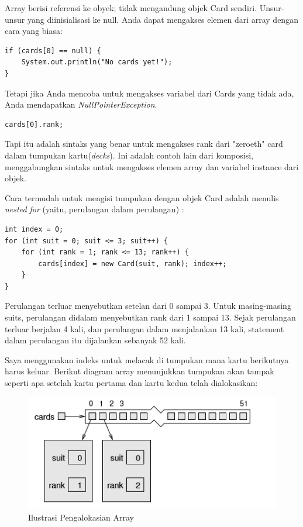 \documentclass[12pt,b5paper,openright,twoside]{book}
\begin{document}
\noindent Array berisi referensi ke obyek; tidak mengandung objek Card sendiri. Unsur-unsur yang diinisialisasi ke null. Anda dapat mengakses elemen dari array dengan cara yang biasa:
\begin{lstlisting}
if (cards[0] == null) { 
    System.out.println("No cards yet!"); 
}
\end{lstlisting}
\noindent Tetapi jika Anda mencoba untuk mengakses variabel dari Cards yang tidak ada, Anda mendapatkan \textit{NullPointerException}.
\begin{lstlisting}
cards[0].rank;
\end{lstlisting}

\noindent Tapi itu adalah sintaks yang benar untuk mengakses rank dari "zeroeth" card dalam tumpukan kartu(\textit{decks}). Ini adalah contoh lain dari komposisi, menggabungkan sintaks untuk mengakses elemen array dan variabel instance dari objek.

\noindent Cara termudah untuk mengisi tumpukan dengan objek Card adalah menulis \textit{nested for} (yaitu, perulangan dalam perulangan) : 
\begin{lstlisting}
int index = 0; 
for (int suit = 0; suit <= 3; suit++) { 
    for (int rank = 1; rank <= 13; rank++) { 
        cards[index] = new Card(suit, rank); index++; 
    } 
}
\end{lstlisting}

\noindent Perulangan terluar menyebutkan setelan dari 0 sampai 3. Untuk masing-masing suits, perulangan didalam menyebutkan rank dari 1 sampai 13. Sejak perulangan terluar berjalan 4 kali, dan perulangan dalam menjalankan 13 kali, statement dalam perulangan itu dijalankan sebanyak 52 kali.

\noindent Saya menggunakan indeks untuk melacak di tumpukan mana kartu berikutnya harus keluar. Berikut diagram array menunjukkan tumpukan akan tampak seperti apa setelah kartu pertama dan kartu kedua telah dialokasikan:
\begin{figure}[h!]
\centering
\includegraphics[scale=0.7]{array_in_for.png}
\caption{Ilustrasi Pengalokasian Array}
\label{fig:univerise4}
\end{figure}
\end{document}
